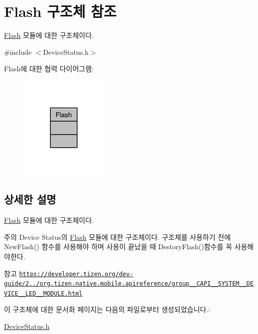 \hypertarget{struct_flash}{\section{Flash 구조체 참조}
\label{struct_flash}
}


\hyperlink{struct_flash}{Flash} 모듈에 대한 구조체이다.  




{\ttfamily \#include $<$Device\-Status.\-h$>$}



Flash에 대한 협력 다이어그램\-:\nopagebreak
\begin{figure}[H]
\begin{center}
\leavevmode
\includegraphics[width=120pt]{d9/df0/struct_flash__coll__graph}
\end{center}
\end{figure}


\subsection{상세한 설명}
\hyperlink{struct_flash}{Flash} 모듈에 대한 구조체이다. 

\begin{DoxyNote}{주의}
Device Status의 \hyperlink{struct_flash}{Flash} 모듈에 대한 구조체이다. 구조체를 사용하기 전에 New\-Flash() 함수를 사용해야 하며 사용이 끝났을 때 Destory\-Flash()함수를 꼭 사용해야한다. 
\end{DoxyNote}
\begin{DoxySeeAlso}{참고}
\href{https://developer.tizen.org/dev-guide/2.3.0/org.tizen.native.mobile.apireference/group__CAPI__SYSTEM__DEVICE__LED__MODULE.html}{\tt https\-://developer.\-tizen.\-org/dev-\/guide/2../org.\-tizen.\-native.\-mobile.\-apireference/group\-\_\-\-\_\-\-C\-A\-P\-I\-\_\-\-\_\-\-S\-Y\-S\-T\-E\-M\-\_\-\-\_\-\-D\-E\-V\-I\-C\-E\-\_\-\-\_\-\-L\-E\-D\-\_\-\-\_\-\-M\-O\-D\-U\-L\-E.\-html} 
\end{DoxySeeAlso}


이 구조체에 대한 문서화 페이지는 다음의 파일로부터 생성되었습니다.\-:\begin{DoxyCompactItemize}
\item 
\hyperlink{_device_status_8h}{Device\-Status.\-h}\end{DoxyCompactItemize}
